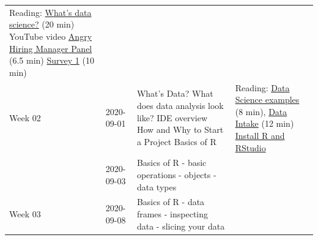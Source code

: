 \documentclass[
]{book}
\begin{document}
\begin{longtable}[]{@{}llll@{}}
\begin{minipage}[t]{0.22\columnwidth}
Reading: \href{readings/module2_what_is_data_science.pdf}{What's data science?} (20 min) YouTube video \href{https://youtu.be/6OFm7YcunWc?t=617}{Angry Hiring Manager Panel} (6.5 min) \href{https://forms.gle/NaqrC87cB8xh6Sdz8}{Survey 1} (10 min)\strut
\end{minipage}\tabularnewline
\begin{minipage}[t]{0.22\columnwidth}\raggedright
Week 02\strut
\end{minipage} & \begin{minipage}[t]{0.22\columnwidth}\raggedright
2020-09-01\strut
\end{minipage} & \begin{minipage}[t]{0.22\columnwidth}\raggedright
What's Data? What does data analysis look like? IDE overview How and Why to Start a Project Basics of R\strut
\end{minipage} & \begin{minipage}[t]{0.22\columnwidth}\raggedright
Reading: \href{readings/module2_eds_leek_whatsdatascience.pdf}{Data Science examples} (8 min), \href{readings/module2_modern_data_science_data_intake.pdf}{Data Intake} (12 min) \protect\hyperlink{install-r}{Install R and RStudio}\strut
\end{minipage}\tabularnewline
\begin{minipage}[t]{0.22\columnwidth}\raggedright
\strut
\end{minipage} & \begin{minipage}[t]{0.22\columnwidth}\raggedright
2020-09-03\strut
\end{minipage} & \begin{minipage}[t]{0.22\columnwidth}\raggedright
Basics of R - basic operations - objects - data types\strut
\end{minipage} & \begin{minipage}[t]{0.22\columnwidth}\raggedright
\strut
\end{minipage}\tabularnewline
\begin{minipage}[t]{0.22\columnwidth}\raggedright
Week 03\strut
\end{minipage} & \begin{minipage}[t]{0.22\columnwidth}\raggedright
2020-09-08\strut
\end{minipage} & \begin{minipage}[t]{0.22\columnwidth}\raggedright
Basics of R - data frames - inspecting data - slicing your data\strut
\end{minipage} & \begin{minipage}[t]{0.22\columnwidth}\raggedright

\end{minipage}
\end{longtable}
\end{document}
